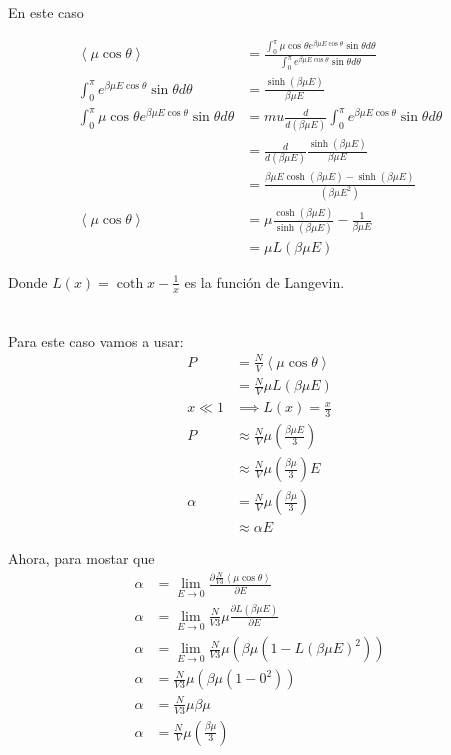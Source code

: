 \documentclass{report}
\begin{document}
En este caso

\begin{align*}
	\left< \mu \cos\theta \right> &= \frac{\int_0^{\pi} \mu \cos\theta e^{\beta \mu E \cos\theta} \sin\theta d\theta}{\int_0^{\pi} e^{\beta \mu E\cos\theta}\sin\theta d\theta}\\
	\int_0^{\pi} e^{\beta \mu E\cos\theta}\sin\theta d\theta &= \frac{\sinh \left( \beta \mu E \right)}{\beta \mu E}\\
	\int_0^{\pi} \mu \cos\theta e^{\beta \mu E \cos\theta} \sin\theta d\theta &= mu \frac{d}{d \left( \beta \mu E \right)} \int_0^\pi e^{\beta \mu E \cos\theta} \sin\theta d\theta\\
	&= \frac{d}{d \left( \beta \mu E \right)} \frac{\sinh \left( \beta \mu E \right)}{\beta \mu E}\\
	&= \frac{\beta\mu E\cosh \left( \beta \mu E \right) - \sinh \left( \beta \mu E \right)}{\left( \beta \mu E^2 \right)}\\
	\left<\mu \cos\theta \right> &= \mu \frac{\cosh \left( \beta \mu E \right)}{\sinh \left( \beta \mu E \right)} - \frac{1}{\beta \mu E}\\
	&= \mu L \left( \beta \mu E \right)
\end{align*}

Donde $L(x) = \coth x - \frac{1}{x}$ es la función de Langevin.

\section{}

Para este caso vamos a usar:
\begin{align*}
	P &= \frac{N}{V} \left<\mu \cos\theta \right>\\
	&= \frac{N}{V} \mu L \left( \beta \mu E \right)\\
	x \ll 1 &\implies L(x) = \frac{x}{3}\\
	P &\approx \frac{N}{V} \mu \left( \frac{\beta \mu E}{3} \right)\\
	&\approx \frac{N}{V} \mu \left( \frac{\beta \mu}{3} \right) E\\
	\alpha &= \frac{N}{V} \mu \left( \frac{\beta \mu}{3} \right)\\
	&\approx \alpha E
\end{align*}

Ahora, para mostar que
\begin{align*}
	\alpha &= \lim_{E \to 0} \frac{\partial \frac{N}{V3}\left< \mu \cos\theta \right>}{\partial E}\\
	\alpha &= \lim_{E \to 0} \frac{N}{V3}\mu\frac{\partial L \left( \beta \mu E \right)}{\partial E}\\
	\alpha &= \lim_{E \to 0} \frac{N}{V3}\mu \left( \beta \mu \left( 1 - L \left( \beta\mu E \right)^2 \right) \right)\\
	\alpha &= \frac{N}{V3}\mu \left( \beta \mu \left( 1 - 0^2 \right) \right)\\
	\alpha &= \frac{N}{V3}\mu \beta \mu\\
	\alpha &= \frac{N}{V}\mu \left(\frac{\beta \mu}{3}\right)
\end{align*}
\end{document}
